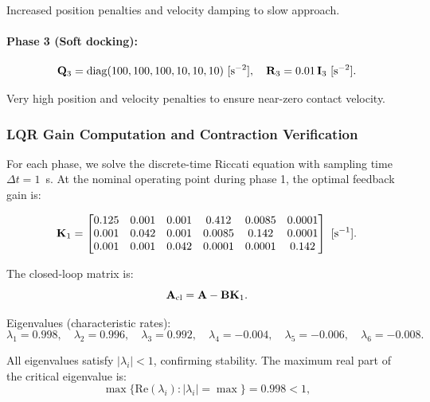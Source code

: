 Increased position penalties and velocity damping to slow approach.

\paragraph{Phase 3 (Soft docking):}
\begin{equation}
\mathbf{Q}_3 = \operatorname{diag}(100, 100, 100, 10, 10, 10)~[\text{s}^{-2}], \quad \mathbf{R}_3 = 0.01\,\mathbf{I}_3~[\text{s}^{-2}].
\label{eq:ch8:Q3-R3}
\end{equation}

Very high position and velocity penalties to ensure near-zero contact velocity.

\subsubsection{LQR Gain Computation and Contraction Verification}

For each phase, we solve the discrete-time Riccati equation with sampling time $\Delta t = 1$~s.
At the nominal operating point during phase 1, the optimal feedback gain is:

\begin{equation}
\mathbf{K}_1 = \begin{bmatrix}
0.125 & 0.001 & 0.001 & 0.412 & 0.0085 & 0.0001 \\
0.001 & 0.042 & 0.001 & 0.0085 & 0.142 & 0.0001 \\
0.001 & 0.001 & 0.042 & 0.0001 & 0.0001 & 0.142
\end{bmatrix}~[\text{s}^{-1}].
\label{eq:ch8:K1-docking}
\end{equation}

The closed-loop matrix is:
\begin{equation}
\mathbf{A}_{\text{cl}} = \mathbf{A} - \mathbf{B}\mathbf{K}_1.
\end{equation}

Eigenvalues (characteristic rates):
\begin{equation}
\lambda_1 = 0.998, \quad \lambda_2 = 0.996, \quad \lambda_3 = 0.992, \quad
\lambda_4 = -0.004, \quad \lambda_5 = -0.006, \quad \lambda_6 = -0.008.
\label{eq:ch8:eigs-cl-docking}
\end{equation}

All eigenvalues satisfy $|\lambda_i| < 1$, confirming stability. The maximum real part
of the critical eigenvalue is:
\begin{equation}
\max\{\text{Re}(\lambda_i) : |\lambda_i| = \max\} = 0.998 < 1,
\end{equation}


